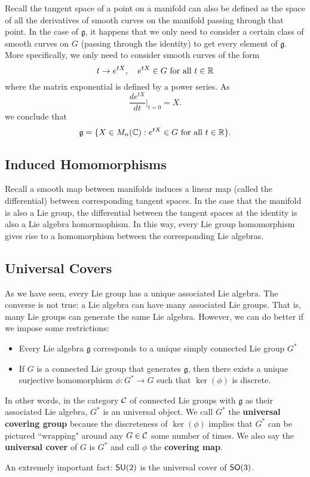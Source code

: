 Recall the tangent space of a point on a manifold can also be defined as the space of all the derivatives of smooth curves on the manifold passing through that point. In the case of $\mathfrak g$, it happens that we only need to consider a certain class of smooth curves on $G$ (passing through the identity) to get every element of $\mathfrak g$. More specifically, we only need to consider smooth curves of the form
\[
    t \rightarrow e^{tX}, \quad e^{tX} \in G \text{ for all } t \in {\mathbb R}
\]
where the matrix exponential is defined by a power series. As
\[
    \frac{d e^{tX}}{dt} \Bigr|_{t = 0} = X.
\]
we conclude that
\[
    \mathfrak g = \{X \in M_n({\mathbb C}) : e^{tX} \in G \text{ for all } t \in {\mathbb R}\}.
\]

\subsection{Induced Homomorphisms}
Recall a smooth map between manifolds induces a linear map (called the differential) between corresponding tangent spaces. In the case that the manifold is also a Lie group, the differential between the tangent spaces at the identity is also a Lie algebra homormophism. In this way, every Lie group homomorphism gives rise to a homomorphism between the corresponding Lie algebras.

\subsection{Universal Covers}
As we have seen, every Lie group has a unique associated Lie algebra. The converse is not true: a Lie algebra can have many associated Lie groups. That is, many Lie groups can generate the same Lie algebra. However, we can do better if we impose some restrictions:
\begin{itemize}
    \item Every Lie algebra $\mathfrak g$ corresponds to a unique simply connected Lie group $G^*$
    \item If $G$ is a connected Lie group that generates $\mathfrak g$, then there exists a unique surjective homomorphism $\phi: G^* \rightarrow G$ such that $\ker(\phi)$ is discrete.
\end{itemize}
In other words, in the category ${\mathcal C}$ of connected Lie groups with $\mathfrak g$ as their associated Lie algebra, $G^*$ is an universal object. We call $G^*$ the \textbf{universal covering group} because the discreteness of $\ker(\phi)$ implies that $G^*$ can be pictured ``wrapping" around any $G \in {\mathcal C}$ some number of times. We also say the \textbf{universal cover} of $G$ is $G^*$ and call $\phi$ the \textbf{covering map}.

An extremely important fact: $\operatorname{\textsf{SU}}(2)$ is the universal cover of $\operatorname{\textsf{SO}}(3)$.
